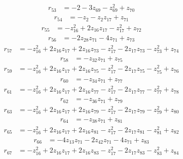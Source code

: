 \begin{align*}
r_{53} &= -2 - 3z_{69} - z_{69}^{2} + z_{70}
\end{align*}
\begin{align*}
r_{54} &= -z_{2} - z_{2}z_{17} + z_{71}
\end{align*}
\begin{align*}
r_{55} &= -z_{16}^{2} + 2z_{16}z_{17} - z_{17}^{2} + z_{72}
\end{align*}
\begin{align*}
r_{56} &= -2z_{28}z_{71} - 4z_{71} + z_{73}
\end{align*}
\begin{align*}
r_{57} &= -z_{16}^{2} + 2z_{16}z_{17} + 2z_{16}z_{73} - z_{17}^{2} - 2z_{17}z_{73} - z_{73}^{2} + z_{74}
\end{align*}
\begin{align*}
r_{58} &= -z_{32}z_{71} + z_{75}
\end{align*}
\begin{align*}
r_{59} &= -z_{16}^{2} + 2z_{16}z_{17} + 2z_{16}z_{75} - z_{17}^{2} - 2z_{17}z_{75} - z_{75}^{2} + z_{76}
\end{align*}
\begin{align*}
r_{60} &= -z_{34}z_{71} + z_{77}
\end{align*}
\begin{align*}
r_{61} &= -z_{16}^{2} + 2z_{16}z_{17} + 2z_{16}z_{77} - z_{17}^{2} - 2z_{17}z_{77} - z_{77}^{2} + z_{78}
\end{align*}
\begin{align*}
r_{62} &= -z_{36}z_{71} + z_{79}
\end{align*}
\begin{align*}
r_{63} &= -z_{16}^{2} + 2z_{16}z_{17} + 2z_{16}z_{79} - z_{17}^{2} - 2z_{17}z_{79} - z_{79}^{2} + z_{80}
\end{align*}
\begin{align*}
r_{64} &= -z_{38}z_{71} + z_{81}
\end{align*}
\begin{align*}
r_{65} &= -z_{16}^{2} + 2z_{16}z_{17} + 2z_{16}z_{81} - z_{17}^{2} - 2z_{17}z_{81} - z_{81}^{2} + z_{82}
\end{align*}
\begin{align*}
r_{66} &= -4z_{13}z_{71} - 2z_{42}z_{71} - 4z_{71} + z_{83}
\end{align*}
\begin{align*}
r_{67} &= -z_{16}^{2} + 2z_{16}z_{17} + 2z_{16}z_{83} - z_{17}^{2} - 2z_{17}z_{83} - z_{83}^{2} + z_{84}
\end{align*}
